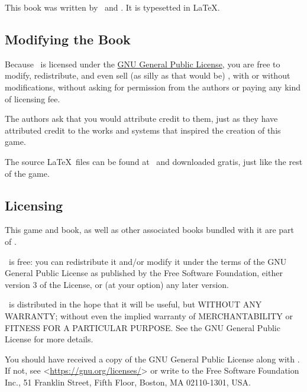 \par
This book was written by \zandy\, and \sam . It is typesetted in \LaTeX .

\subsection{Modifying the Book}

\par
Because \getTitle\, is licensed under the \hyperlink{Licensing}{GNU General Public License}, you are free to modify, redistribute, and even sell (as silly as that would be) \getTitle , with or without modifications, without asking for permission from the authors or paying any kind of licensing fee.

\par
The authors ask that you would attribute credit to them, just as they have attributed credit to the works and systems that inspired the creation of this game.

\par
The source \LaTeX\, files can be found at \website\, and downloaded gratis, just like the rest of the game.

\subsection{Licensing}
\par
\hypertarget{Licensing}{This game and book, as well as other associated books bundled with it are part of \getTitle .}

\par
\getTitle\, is free: you can redistribute it and/or modify it under the terms of the GNU General Public License as published by the Free Software Foundation, either version 3 of the License, or (at your option) any later version.

\par
\getTitle\, is distributed in the hope that it will be useful, but WITHOUT ANY WARRANTY; without even the implied warranty of MERCHANTABILITY or FITNESS FOR A PARTICULAR PURPOSE. See the GNU General Public License for more details.

You should have received a copy of the GNU General Public License along with \getTitle . If not, see <\href{https://gnu.org/licenses/}{https://gnu.org/licenses/}> or write to the Free Software Foundation Inc., 51 Franklin Street, Fifth Floor, Boston, MA 02110-1301, USA.